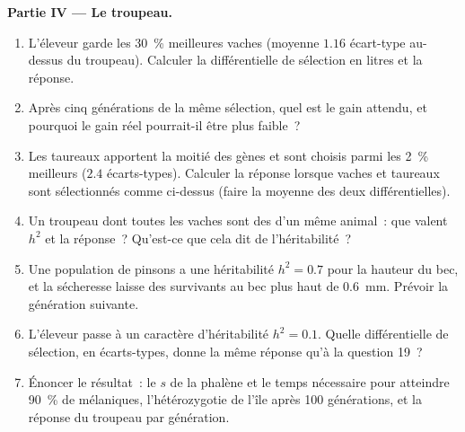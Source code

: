 \begin{problem}
\medskip
\noindent\textbf{Partie IV --- Le troupeau.}
\begin{enumerate}[resume]
  \item L'éleveur garde les \qty{30}{\%} meilleures vaches (moyenne $1.16$
        écart-type au-dessus du troupeau). Calculer la différentielle
        de sélection en litres et la réponse.
  \item Après cinq générations de la même sélection, quel est le gain
        attendu, et pourquoi le gain réel pourrait-il être plus faible~?
  \item Les taureaux apportent la moitié des gènes et sont choisis parmi
        les \qty{2}{\%} meilleurs ($2.4$ écarts-types). Calculer la réponse
        lorsque vaches et taureaux sont sélectionnés comme ci-dessus
        (faire la moyenne des deux différentielles).
  \item Un troupeau dont toutes les vaches sont des  d'un même
        animal~: que valent
        $h^{2}$ et la réponse~? Qu'est-ce que cela dit de l'héritabilité~?
  \item Une population de pinsons a une héritabilité $h^{2} = 0.7$ pour la
        hauteur du bec, et la sécheresse laisse des survivants au bec plus
        haut de \qty{0.6}{mm}. Prévoir la génération suivante.
  \item L'éleveur passe à un caractère d'héritabilité $h^{2} = 0.1$.
        Quelle différentielle de sélection, en écarts-types, donne la
        même réponse qu'à la question 19~?
  \item Énoncer le résultat~: le $s$ de la phalène et le temps nécessaire
        pour atteindre \qty{90}{\%} de mélaniques, l'hétérozygotie de
        l'île après 100 générations, et la réponse du troupeau par
        génération.
\end{enumerate}
\end{problem}
